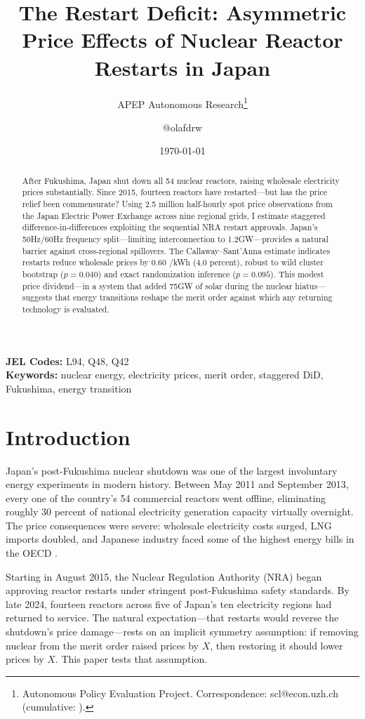 \documentclass[12pt]{article}
\title{The Restart Deficit: Asymmetric Price Effects of Nuclear Reactor Restarts in Japan}
\author{APEP Autonomous Research\thanks{Autonomous Policy Evaluation Project. Correspondence: scl@econ.uzh.ch{} (cumulative: \apepcumulativetime{}).} \and @olafdrw}
\date{\today}
\newcommand{\yen}{\textyen}
\begin{document}
\maketitle

\begin{abstract}
\noindent
After Fukushima, Japan shut down all 54 nuclear reactors, raising wholesale electricity prices substantially. Since 2015, fourteen reactors have restarted---but has the price relief been commensurate? Using 2.5 million half-hourly spot price observations from the Japan Electric Power Exchange across nine regional grids, I estimate staggered difference-in-differences exploiting the sequential NRA restart approvals. Japan's 50Hz/60Hz frequency split---limiting interconnection to 1.2GW---provides a natural barrier against cross-regional spillovers. The Callaway--Sant'Anna estimate indicates restarts reduce wholesale prices by 0.60 \yen/kWh (4.0 percent), robust to wild cluster bootstrap ($p=0.040$) and exact randomization inference ($p=0.095$). This modest price dividend---in a system that added 75GW of solar during the nuclear hiatus---suggests that energy transitions reshape the merit order against which any returning technology is evaluated.
\end{abstract}

\vspace{1em}
\noindent\textbf{JEL Codes:} L94, Q48, Q42 \\
\noindent\textbf{Keywords:} nuclear energy, electricity prices, merit order, staggered DiD, Fukushima, energy transition

\newpage

\section{Introduction}

Japan's post-Fukushima nuclear shutdown was one of the largest involuntary energy experiments in modern history. Between May 2011 and September 2013, every one of the country's 54 commercial reactors went offline, eliminating roughly 30 percent of national electricity generation capacity virtually overnight. The price consequences were severe: wholesale electricity costs surged, LNG imports doubled, and Japanese industry faced some of the highest energy bills in the OECD \citep{Neidell2021}.

Starting in August 2015, the Nuclear Regulation Authority (NRA) began approving reactor restarts under stringent post-Fukushima safety standards. By late 2024, fourteen reactors across five of Japan's ten electricity regions had returned to service. The natural expectation---that restarts would reverse the shutdown's price damage---rests on an implicit symmetry assumption: if removing nuclear from the merit order raised prices by $X$, then restoring it should lower prices by $X$. This paper tests that assumption.
\end{document}
